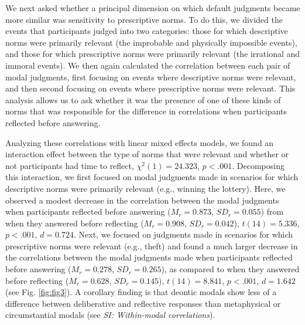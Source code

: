 \documentclass[9pt,twocolumn,twoside]{pnas-new}
\begin{document}
We next asked whether a principal dimension on which default judgments became more similar was sensitivity to prescriptive norms. To do this, we divided the events that participants judged into two categories: those for which descriptive norms were primarily relevant (the improbable and physically impossible events), and those for which prescriptive norms were primarily relevant (the irrational and immoral events). We then again calculated the correlation between each pair of modal judgments, first focusing on events where descriptive norms were relevant, and then second focusing on events where prescriptive norms were relevant. This analysis allows us to ask whether it was the presence of one of these kinds of norms that was responsible for the difference in correlations when participants reflected before answering.

Analyzing these correlations with linear mixed effects models, we found an interaction effect between the type of norms that were relevant and whether or not participants had time to reflect, $\chi^2(1) = 24.323$, $p < .001$. Decomposing this interaction, we first focused on modal judgments made in scenarios for which descriptive norms were primarily relevant (e.g., winning the lottery). Here, we observed a modest decrease in the correlation between the modal judgments when participants reflected before answering ($M_{r} = 0.873$, $SD_{r} = 0.055$) from when they answered before reflecting ($M_{r} = 0.908$, $SD_{r} = 0.042$), $t(14) = 5.336$, $p  < .001$, $d = 0.724$. Next, we focused on judgments made in scenarios for which prescriptive norms were relevant (e.g., theft) and found a much larger decrease in the correlations between the modal judgments made when participants reflected before answering ($M_{r} = 0.278$, $SD_{r} = 0.265$), as compared to when they answered before reflecting ($M_{r} = 0.628$, $SD_{r} = 0.145$), $t(14) = 8.841$, $p  < .001$, $d = 1.642$ (see Fig. \ref{fig:fig3}). A corollary finding is that deontic modals show less of a difference between deliberative and reflective responses than metaphysical or circumstantial modals (see \textit{SI: Within-modal correlations}). 
\end{document}
